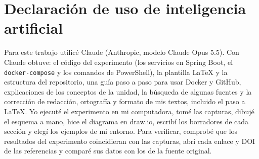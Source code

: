\section{Declaración de uso de inteligencia artificial}
Para este trabajo utilicé Claude (Anthropic, modelo Claude Opus 5.5). Con Claude obtuve: el código del experimento (los servicios en Spring Boot, el \texttt{docker-compose} y los comandos de PowerShell), la plantilla LaTeX y la estructura del repositorio, una guía paso a paso para usar Docker y GitHub, explicaciones de los conceptos de la unidad, la búsqueda de algunas fuentes y la corrección de redacción, ortografía y formato de mis textos, incluido el paso a LaTeX.
Yo ejecuté el experimento en mi computadora, tomé las capturas, dibujé el esquema a mano, hice el diagrama en draw.io, escribí los borradores de cada sección y elegí los ejemplos de mi entorno. Para verificar, comprobé que los resultados del experimento coincidieran con las capturas, abrí cada enlace y DOI de las referencias y comparé sus datos con los de la fuente original.
